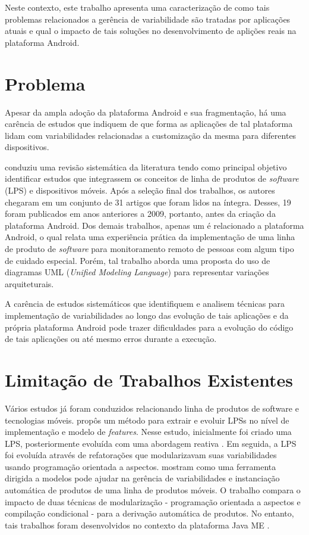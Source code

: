 Neste contexto, este trabalho apresenta uma caracterização de como tais problemas
relacionados a gerência de variabilidade são tratadas por aplicações atuais e
qual o impacto de tais soluções no desenvolvimento de aplições reais na plataforma
Android.

\section{Problema}

Apesar da ampla adoção da plataforma Android e sua fragmentação, há uma carência
de estudos que indiquem de que forma as aplicações de tal plataforma lidam com
variabilidades relacionadas a customização da mesma para diferentes dispositivos. 

 conduziu uma revisão sistemática da literatura tendo como
principal objetivo identificar estudos que integrassem os conceitos de linha de
produtos de \textit{software} (LPS) e dispositivos móveis. Após a seleção final
dos trabalhos, os autores chegaram em um conjunto de 31 artigos que foram lidos
na íntegra. Desses, 19 foram publicados em anos anteriores a 2009, portanto, antes
da criação da plataforma Android. Dos demais trabalhos, apenas um é relacionado a
plataforma Android, o qual relata uma experiência prática da implementação de uma
linha de produto de \textit{software} para monitoramento remoto de pessoas com
algum tipo de cuidado especial. Porém, tal trabalho aborda uma proposta do uso de
diagramas UML (\textit{Unified Modeling Language}) para representar variações arquiteturais.

A carência de estudos sistemáticos que identifiquem e analisem técnicas para
implementação de variabilidades ao longo das evolução de tais aplicações e da
própria plataforma Android pode trazer dificuldades para a evolução do código de
tais aplicações ou até mesmo erros durante a execução.

\section{Limitação de Trabalhos Existentes}

Vários estudos já foram conduzidos relacionando linha de produtos de software e
tecnologias móveis.  propôs um método para extrair e evoluir LPSs
no nível de implementação e modelo de \textit{features}.  Nesse estudo, inicialmente
foi criado uma LPS, posteriormente evoluída com uma abordagem reativa \cite{Krueger2002}.
Em seguida, a LPS foi evoluída através de refatorações que modularizavam suas
variabilidades usando programação orientada a aspectos.  mostram
como uma ferramenta dirigida a modelos pode ajudar na gerência de variabilidades
e instanciação automática de produtos de uma linha de produtos móveis. O trabalho
compara o impacto de duas técnicas de modularização - programação orientada a aspectos
e compilação condicional - para a derivação automática de produtos. No entanto,
tais trabalhos foram desenvolvidos no contexto da plataforma Java ME \cite{oraclejme}.

